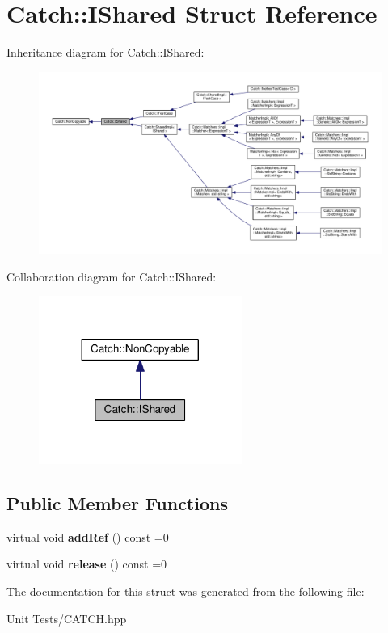 \hypertarget{structCatch_1_1IShared}{}\section{Catch\+:\+:I\+Shared Struct Reference}
\label{structCatch_1_1IShared}


Inheritance diagram for Catch\+:\+:I\+Shared\+:
\nopagebreak
\begin{figure}[H]
\begin{center}
\leavevmode
\includegraphics[width=350pt]{structCatch_1_1IShared__inherit__graph}
\end{center}
\end{figure}


Collaboration diagram for Catch\+:\+:I\+Shared\+:
\nopagebreak
\begin{figure}[H]
\begin{center}
\leavevmode
\includegraphics[width=188pt]{structCatch_1_1IShared__coll__graph}
\end{center}
\end{figure}
\subsection*{Public Member Functions}
\begin{DoxyCompactItemize}
\item 
virtual void {\bfseries add\+Ref} () const =0\hypertarget{structCatch_1_1IShared_ae383df68557cdaf0910b411af04d9e33}{}\label{structCatch_1_1IShared_ae383df68557cdaf0910b411af04d9e33}

\item 
virtual void {\bfseries release} () const =0\hypertarget{structCatch_1_1IShared_a002f52624728a763956fb6f230cb2f57}{}\label{structCatch_1_1IShared_a002f52624728a763956fb6f230cb2f57}

\end{DoxyCompactItemize}


The documentation for this struct was generated from the following file\+:\begin{DoxyCompactItemize}
\item 
Unit Tests/C\+A\+T\+C\+H.\+hpp\end{DoxyCompactItemize}
